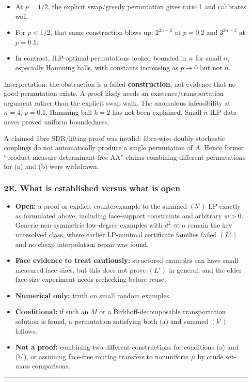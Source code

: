 \begin{itemize}
\tightlist
\item
  At \(p=1/2\), the explicit swap/greedy permutation gives ratio 1 and calibrates well.
\item
  For \(p<1/2\), that same construction blows up:
  \(2^{2n-2}\) at \(p=0.2\) and \(3^{2n-2}\) at \(p=0.1\).
\item
  In contrast, ILP-optimal permutations looked bounded in \(n\) for small \(n\), especially Hamming balls, with constants increasing as \(p\to0\) but not \(n\).
\end{itemize}

Interpretation: the obstruction is a failed \textbf{construction}, not evidence that no good permutation exists. A proof likely needs an existence/transportation argument rather than the explicit swap walk. The anomalous infeasibility at \(n=4\), \(p=0.1\), Hamming ball \(k=2\) has not been explained. Small-\(n\) ILP data never proved uniform boundedness.

A claimed fibre SDR/lifting proof was invalid: fibre-wise doubly stochastic couplings do not automatically produce a single permutation of \(A\). Hence former ``product-measure determinant-free AA'' claims combining different permutations for (a) and (b) were withdrawn.

\subsubsection{2E. What is established versus what is open}\label{e.-what-is-established-versus-what-is-open}

\begin{itemize}
\tightlist
\item
  \textbf{Open:} a proof or explicit counterexample to the summed-\((b')\) LP exactly as formulated above, including face-support constraints and arbitrary \(w>0\). Generic non-symmetric low-degree examples with \(d^2\ll n\) remain the key unresolved class, where earlier LP-minimal certificate families failed \((L')\) and no cheap interpolation repair was found.
\item
  \textbf{Face evidence to treat cautiously:} structured examples can have small measured face sizes, but this does not prove \((L')\) in general, and the older face-size experiment needs rechecking before reuse.
\item
  \textbf{Numerical only:} truth on small random examples.
\item
  \textbf{Conditional:} if such an \(M\) or a Birkhoff-decomposable transportation solution is found, a permutation satisfying both (a) and summed \((b')\) follows.
\item
  \textbf{Not a proof:} combining two different constructions for conditions (a) and (b'), or assuming face-free routing transfers to nonuniform \(\mu\) by crude set-mass comparisons.
\end{itemize}

\begin{center}\rule{0.5\linewidth}{0.5pt}\end{center}
